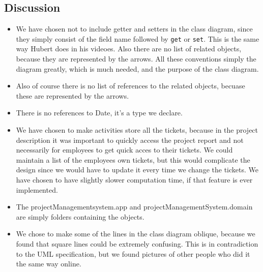 \subsection{Discussion}
\begin{itemize}
    \item We have chosen not to include getter and setters in the class diagram, since they simply consist of the field name followed by \texttt{get} or \texttt{set}. This is the same way Hubert does in his videoes. Also there are no list of related objects, because they are represented by the arrows. All these conventions simply the diagram greatly, which is much needed, and the purpose of the class diagram.
    \item Also of course there is no list of references to the related objects, becuase these are represented by the arrows.
    \item There is no references to Date, it's a type we declare.
    \item We have chosen to make activities store all the tickets, because in the project description it was important to quickly access the project report and not necessarily for employees to get quick acces to their tickets. We could maintain a list of the employees own tickets, but this would complicate the design since we would have to update it every time we change the tickets. We have chosen to have slightly slower computation time, if that feature is ever implemented.
    \item The projectManagementsystem.app and projectManagementSystem.domain are simply folders containing the objects. 
    \item We chose to make some of the lines in the class diagram oblique, because we found that square lines could be extremely confusing. This is in contradiction to the UML specification, but we found pictures of other people who did it the same way online.
\end{itemize}

